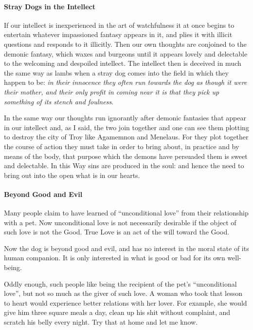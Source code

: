\paragraph{Stray Dogs in the Intellect}
\begin{quotex}
If our intellect is inexperienced in the art of watchfulness it at once begins to entertain whatever impassioned fantasy appears in it, and plies it with illicit questions and responds to it illicitly. Then our own thoughts are conjoined to the demonic fantasy, which waxes and burgeons until it appears lovely and delectable to the welcoming and despoiled intellect. The intellect then is deceived in much the same way as lambs when a stray dog comes into the field in which they happen to be: \emph{in their innocence they often run towards the dog as though it were their mother, and their only profit in coming near it is that they pick up something of its stench and foulness}.

In the same way our thoughts run ignorantly after demonic fantasies that appear in our intellect and, as I said, the two join together and one can see them plotting to destroy the city of Troy like Agamemnon and Menelaus. For they plot together the course of action they must take in order to bring about, in practice and by means of the body, that purpose which the demons have persuaded them is sweet and delectable. In this Way sins are produced in the soul: and hence the need to bring out into the open what is in our hearts. 

\end{quotex}
\paragraph{Beyond Good and Evil}
Many people claim to have learned of “unconditional love” from their relationship with a pet. Now unconditional love is not necessarily desirable if the object of such love is not the Good. True Love is an act of the will toward the Good.

Now the dog is beyond good and evil, and has no interest in the moral state of its human companion. It is only interested in what is good or bad for its own well-being.

Oddly enough, such people like being the recipient of the pet's “unconditional love”, but not so much as the giver of such love. A woman who took that lesson to heart would experience better relations with her lover. For example, she would give him three square meals a day, clean up his shit without complaint, and scratch his belly every night. Try that at home and let me know.


